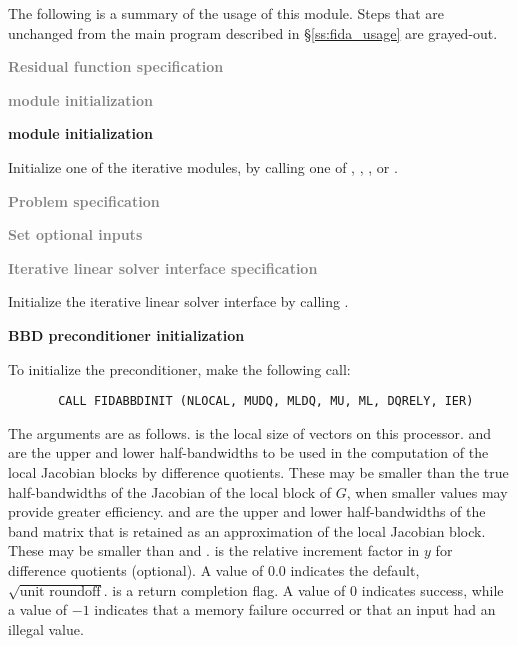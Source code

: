 The following is a summary of the usage of this module. Steps that are unchanged
from the main program described in \S\ref{ss:fida_usage} are grayed-out.

\begin{Steps}
  
\item \textcolor{gray}{\bf Residual function specification}

\item \textcolor{gray}{\bf {\nvector} module initialization}

\item {\bf {\sunlinsol} module initialization}

  Initialize one of the iterative {\sunlinsol} modules, by calling one
  of , , ,
   or .

\item \textcolor{gray}{\bf Problem specification}

\item \textcolor{gray}{\bf Set optional inputs}

\item \textcolor{gray}{\bf Iterative linear solver interface specification}

  Initialize the {\idaspils} iterative linear solver interface
  by calling .

\item {\bf BBD preconditioner initialization}

  To initialize the {\idabbdpre} preconditioner, make the following call:
\begin{verbatim}
       CALL FIDABBDINIT (NLOCAL, MUDQ, MLDQ, MU, ML, DQRELY, IER)
\end{verbatim}
  The arguments are as follows.
   is the local size of vectors on this processor.
   and  are the upper and lower half-bandwidths to be used in 
  the computation of the local Jacobian blocks by difference quotients.
  These may be smaller than the true half-bandwidths of the
  Jacobian of the local block of $G$, when smaller values may
  provide greater efficiency.
   and  are the upper and lower half-bandwidths of the band matrix
  that  is retained as an approximation of the local Jacobian block.
  These may be smaller than  and .
   is the relative increment factor in $y$ for difference quotients
  (optional). A value of $0.0$ indicates the default, $\sqrt{\text{unit roundoff}}$.
   is a return completion flag.  A value of $0$ indicates success, while
  a value of $-1$ indicates that a memory failure occurred or that an input had
  an illegal value.


\end{Steps}
